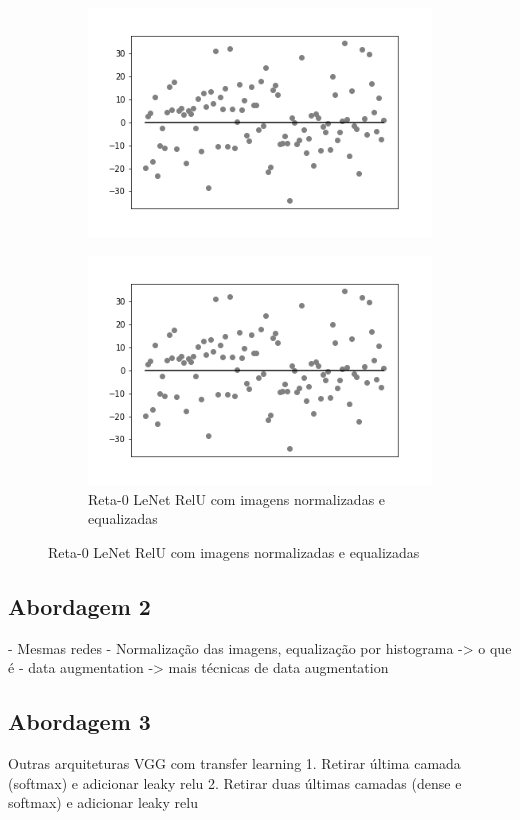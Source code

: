 \begin{figure}[hb!]
\begin{subfigure}[hb]{0.5\linewidth}
    \label{fig:redeneuralbiologica}
    \includegraphics[width=\linewidth]{img/graficos-fase2/fig-reta-0-lenetregressor-relu-data-augmentation-2-1.png}%
  \end{subfigure}%
  \begin{subfigure}[hb]{0.5\linewidth}
    \caption{Reta-0 LeNet RelU com imagens normalizadas e equalizadas}
    \label{fig:redeneuralbiologica}
   \includegraphics[width=\linewidth]{img/graficos-fase2/fig-reta-0-lenetregressor-relu-data-augmentation-2-1.png}
  \end{subfigure}%
\end{figure}



\subsection{Abordagem 2}

- Mesmas redes
- Normalização das imagens, equalização por histograma -> o que é
- data augmentation ->  mais técnicas de data augmentation

\subsection{Abordagem 3}

Outras arquiteturas
VGG
com transfer learning
1. Retirar última camada (softmax) e adicionar leaky relu
2. Retirar duas últimas camadas (dense e softmax) e adicionar leaky relu
